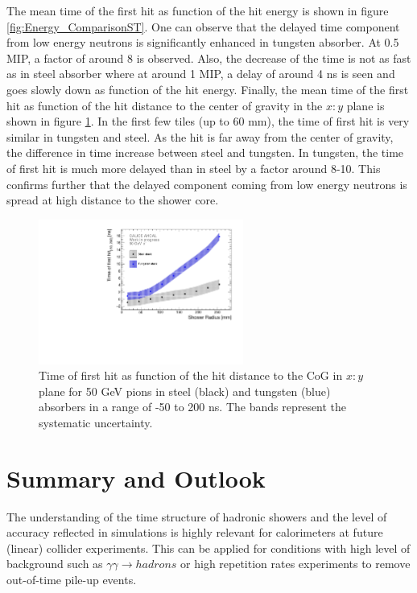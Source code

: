 The mean time of the first hit as function of the hit energy is shown in figure \ref{fig:Energy_ComparisonST}. One can observe that the delayed time component from low energy neutrons is significantly enhanced in tungsten absorber. At 0.5 MIP, a factor of around 8 is observed. Also, the decrease of the time is not as fast as in steel absorber where at around 1 MIP, a delay of around 4 ns is seen and goes slowly down as function of the hit energy. Finally, the mean time of the first hit as function of the hit distance to the center of gravity in the $x:y$ plane is shown in figure \ref{fig:Radius_ComparisonST}. In the first few tiles (up to 60 mm), the time of first hit is very similar in tungsten and steel. As the hit is far away from the center of gravity, the difference in time increase between steel and tungsten. In tungsten, the time of first hit is much more delayed than in steel by a factor around 8-10. This confirms further that the delayed component coming from low energy neutrons is spread at high distance to the shower core.

\begin{figure}[htbp!]
	\centering
	\includegraphics[width=0.6\textwidth]{../Thesis_Plots/Timing/Pions/Plots/ComparisonRadius_SteelTungsten.pdf}
	\caption{Time of first hit as function of the hit distance to the CoG in $x:y$ plane for 50 GeV pions in steel (black) and tungsten (blue) absorbers in a range of -50 to 200 ns. The bands represent the systematic uncertainty.}
	\label{fig:Radius_ComparisonST}
\end{figure}

\section{Summary and Outlook}

The understanding of the time structure of hadronic showers and the level of accuracy reflected in \geant simulations is highly relevant for calorimeters at future (linear) collider experiments. This can be applied for conditions with high level of background such as $\gamma\gamma \rightarrow hadrons$ or high repetition rates experiments to remove out-of-time pile-up events.

